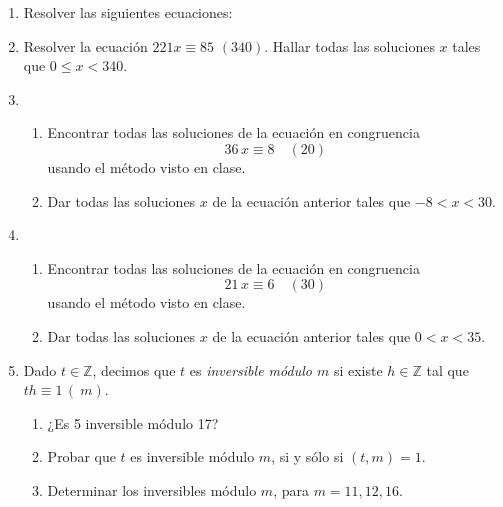 \documentclass[a4paper,12pt,twoside,spanish,reqno]{amsbook}
\numberwithin{equation}{section}
\begin{document}
\begin{enumerate}
\item Resolver las siguientes ecuaciones:


\item Resolver la ecuaci\'on $221 x \equiv 85\,\, (340)$. Hallar todas las soluciones $x$ tales que $0 \le x < 340$.

\item 
\begin{enumerate}
    \item Encontrar todas las soluciones de la ecuaci\'on en congruencia
    $$36\,x\equiv 8 \quad (20)$$
    usando el método visto en clase.
    \item Dar todas las soluciones $x$ de la ecuaci\'on anterior tales que $-8 < x < 30$.
\end{enumerate}


\item 
\begin{enumerate}
\item Encontrar todas las soluciones de la ecuaci\'on en congruencia
$$21\,x\equiv 6 \quad (30)$$
usando el método visto en clase.
\item Dar todas las soluciones $x$ de la ecuaci\'on anterior tales que $0 < x < 35$.
\end{enumerate}





\item Dado $t \in {\mathbb Z}$, decimos que $t$ es {\it inversible m\'odulo $m$} si existe $h \in {\mathbb Z}$ tal que $th\equiv 1\,(\ m)$.
  \begin{enumerate}
  \item ¿Es 5 inversible m\'odulo 17?
  \item Probar que $t$ es inversible m\'odulo $m$, si y s\'olo si $(t,m)=1$.
  \item Determinar los inversibles m\'odulo $m$, para $m=11,12,16$.
  \end{enumerate}




\end{enumerate}
\end{document}
